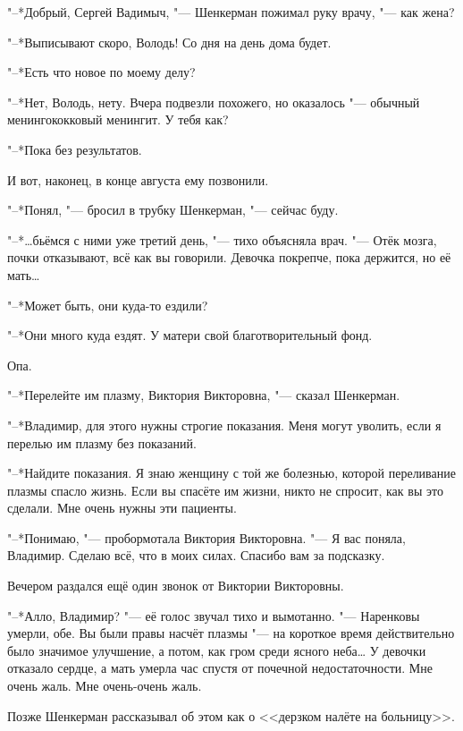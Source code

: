"--*Добрый, Сергей Вадимыч, "--- Шенкерман пожимал руку врачу, "--- как жена?

"--*Выписывают скоро, Володь!
Со дня на день дома будет.

"--*Есть что новое по моему делу?

"--*Нет, Володь, нету.
Вчера подвезли похожего, но оказалось "--- обычный менингококковый менингит.
У тебя как?

"--*Пока без результатов.

И вот, наконец, в конце августа ему позвонили.

\label{Fri_2012_08_24}

"--*Понял, "--- бросил в трубку Шенкерман, "--- сейчас буду.

"--*\dots{}бьёмся с ними уже третий день, "--- тихо объясняла врач.
"--- Отёк мозга, почки отказывают, всё как вы говорили.
Девочка покрепче, пока держится, но её мать\dots{}

"--*Может быть, они куда-то ездили?

"--*Они много куда ездят.
У матери свой благотворительный фонд.

Опа.

"--*Перелейте им плазму, Виктория Викторовна, "--- сказал Шенкерман.

"--*Владимир, для этого нужны строгие показания.
Меня могут уволить, если я перелью им плазму без показаний.

"--*Найдите показания.
Я знаю женщину с той же болезнью, которой переливание плазмы спасло жизнь.
Если вы спасёте им жизни, никто не спросит, как вы это сделали.
Мне очень нужны эти пациенты.

"--*Понимаю, "--- пробормотала Виктория Викторовна.
"--- Я вас поняла, Владимир.
Сделаю всё, что в моих силах.
Спасибо вам за подсказку.

Вечером раздался ещё один звонок от Виктории Викторовны.

"--*Алло, Владимир? "--- её голос звучал тихо и вымотанно.
"--- Наренковы умерли, обе.
Вы были правы насчёт плазмы "--- на короткое время действительно было значимое улучшение, а потом, как гром среди ясного неба\dots{}
У девочки отказало сердце, а мать умерла час спустя от почечной недостаточности.
Мне очень жаль.
Мне очень-очень жаль.

\asterism

\textspace

Позже Шенкерман рассказывал об этом как о <<дерзком налёте на больницу>>.

\textspace

